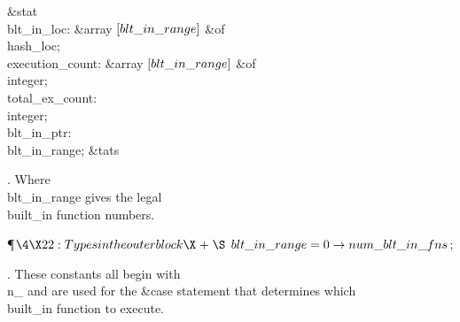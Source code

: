 \&{stat} \\{blt\_in\_loc}: \&{array} $[\\{blt\_in\_range}]$ \1\&{of}\5
\\{hash\_loc};\2\6
\4\\{execution\_count}: \&{array} $[\\{blt\_in\_range}]$ \1\&{of}\5
\\{integer};\2\6
\4\\{total\_ex\_count}: \\{integer};%
\6
\4\\{blt\_in\_ptr}: \\{blt\_in\_range};\6
\&{tats}\par
\fi

.
Where \\{blt\_in\_range} gives the legal \\{built\_in} function numbers.

\Y\P$\4\X22:Types in the outer block\X\mathrel{+}\S$\6
$\\{blt\_in\_range}=0\to\\{num\_blt\_in\_fns}$;\par
\fi

.
These constants all begin with \\{n\_} and are used for the   \&{case}
statement that determines which \\{built\_in} function to execute.


